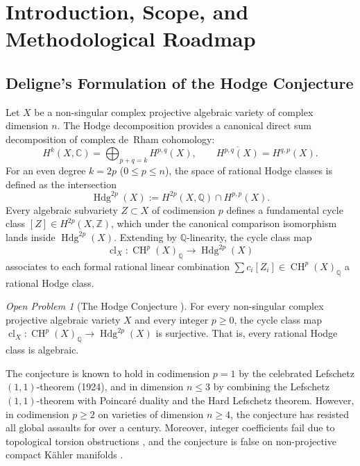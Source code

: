 \documentclass[11pt,a4paper]{article}
\theoremstyle{definition}
\theoremstyle{remark}
\newtheorem{openproblem}[theorem]{Open Problem}
\DeclareMathOperator{\Hdg}{Hdg}
\DeclareMathOperator{\CH}{CH}
\DeclareMathOperator{\cl}{cl}
\begin{document}
\tableofcontents

\section{Introduction, Scope, and Methodological Roadmap}
\label{sec:intro}

\subsection{Deligne's Formulation of the Hodge Conjecture}
Let $X$ be a non-singular complex projective algebraic variety of complex dimension $n$. The Hodge decomposition provides a canonical direct sum decomposition of complex de~Rham cohomology:
\begin{equation}
H^k(X, \mathbb{C}) = \bigoplus_{p+q=k} H^{p,q}(X), \qquad \overline{H^{p,q}(X)} = H^{q,p}(X).
\end{equation}
For an even degree $k = 2p$ ($0 \le p \le n$), the space of rational Hodge classes is defined as the intersection
\begin{equation}
\Hdg^{2p}(X) := H^{2p}(X, \mathbb{Q}) \cap H^{p,p}(X).
\end{equation}
Every algebraic subvariety $Z \subset X$ of codimension $p$ defines a fundamental cycle class $[Z] \in H^{2p}(X, \mathbb{Z})$, which under the canonical comparison isomorphism lands inside $\Hdg^{2p}(X)$. Extending by $\mathbb{Q}$-linearity, the cycle class map
\begin{equation}
\cl_X : \CH^p(X)_{\mathbb{Q}} \longrightarrow \Hdg^{2p}(X)
\end{equation}
associates to each formal rational linear combination $\sum c_i [Z_i] \in \CH^p(X)_{\mathbb{Q}}$ a rational Hodge class.

\begin{openproblem}[The Hodge Conjecture \cite{Deligne2000}]
For every non-singular complex projective algebraic variety $X$ and every integer $p \ge 0$, the cycle class map $\cl_X : \CH^p(X)_{\mathbb{Q}} \to \Hdg^{2p}(X)$ is surjective. That is, every rational Hodge class is algebraic.
\end{openproblem}

The conjecture is known to hold in codimension $p = 1$ by the celebrated Lefschetz $(1,1)$-theorem (1924), and in dimension $n \le 3$ by combining the Lefschetz $(1,1)$-theorem with Poincaré duality and the Hard Lefschetz theorem. However, in codimension $p \ge 2$ on varieties of dimension $n \ge 4$, the conjecture has resisted all global assaults for over a century. Moreover, integer coefficients fail due to topological torsion obstructions \cite{AtiyahHirzebruch1962,Kollar1992,Totaro1997}, and the conjecture is false on non-projective compact Kähler manifolds \cite{Voisin2002}.
\end{document}
